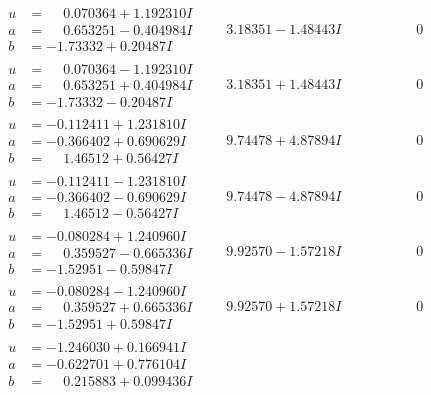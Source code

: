\documentclass[1p]{elsarticle_modified}
\theoremstyle{definition}
\begin{document}
$$\begin{array}{c|c|c}
\begin{aligned}
u &= \phantom{-}0.070364 + 1.192310 I \\
a &= \phantom{-}0.653251 - 0.404984 I \\
b &= -1.73332 + 0.20487 I\end{aligned}
 & \phantom{-}3.18351 - 1.48443 I & \phantom{-0.000000 } 0 \\ \hline\begin{aligned}
u &= \phantom{-}0.070364 - 1.192310 I \\
a &= \phantom{-}0.653251 + 0.404984 I \\
b &= -1.73332 - 0.20487 I\end{aligned}
 & \phantom{-}3.18351 + 1.48443 I & \phantom{-0.000000 } 0 \\ \hline\begin{aligned}
u &= -0.112411 + 1.231810 I \\
a &= -0.366402 + 0.690629 I \\
b &= \phantom{-}1.46512 + 0.56427 I\end{aligned}
 & \phantom{-}9.74478 + 4.87894 I & \phantom{-0.000000 } 0 \\ \hline\begin{aligned}
u &= -0.112411 - 1.231810 I \\
a &= -0.366402 - 0.690629 I \\
b &= \phantom{-}1.46512 - 0.56427 I\end{aligned}
 & \phantom{-}9.74478 - 4.87894 I & \phantom{-0.000000 } 0 \\ \hline\begin{aligned}
u &= -0.080284 + 1.240960 I \\
a &= \phantom{-}0.359527 - 0.665336 I \\
b &= -1.52951 - 0.59847 I\end{aligned}
 & \phantom{-}9.92570 - 1.57218 I & \phantom{-0.000000 } 0 \\ \hline\begin{aligned}
u &= -0.080284 - 1.240960 I \\
a &= \phantom{-}0.359527 + 0.665336 I \\
b &= -1.52951 + 0.59847 I\end{aligned}
 & \phantom{-}9.92570 + 1.57218 I & \phantom{-0.000000 } 0 \\ \hline\begin{aligned}
u &= -1.246030 + 0.166941 I \\
a &= -0.622701 + 0.776104 I \\
b &= \phantom{-}0.215883 + 0.099436 I\end{aligned}

\end{array}$$
\end{document}
